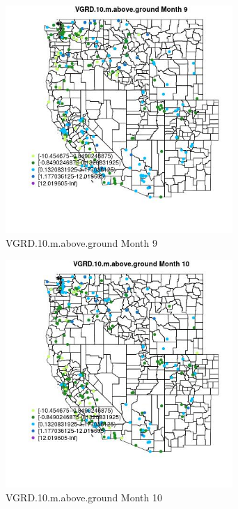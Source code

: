 \begin{figure} 
\centering  
\includegraphics[width=0.77\textwidth]{Code_Outputs/Report_ML_input_PM25_Step4_part_e_de_duplicated_aveswNAs_MapObsMo9VGRD10maboveground.jpg} 
\caption{\label{fig:Report_ML_input_PM25_Step4_part_e_de_duplicated_aveswNAsMapObsMo9VGRD10maboveground}VGRD.10.m.above.ground Month 9} 
\end{figure} 
 

\begin{figure} 
\centering  
\includegraphics[width=0.77\textwidth]{Code_Outputs/Report_ML_input_PM25_Step4_part_e_de_duplicated_aveswNAs_MapObsMo10VGRD10maboveground.jpg} 
\caption{\label{fig:Report_ML_input_PM25_Step4_part_e_de_duplicated_aveswNAsMapObsMo10VGRD10maboveground}VGRD.10.m.above.ground Month 10} 
\end{figure} 
 

